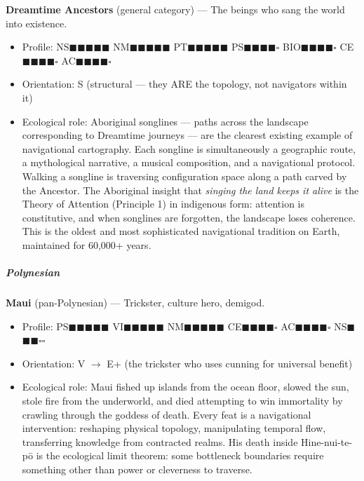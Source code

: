 \textbf{Dreamtime Ancestors} (general category) — The beings who sang the world into existence.

\begin{itemize}[nosep,leftmargin=*]
  \item Profile: NS$\blacksquare$$\blacksquare$$\blacksquare$$\blacksquare$$\blacksquare$ NM$\blacksquare$$\blacksquare$$\blacksquare$$\blacksquare$$\blacksquare$ PT$\blacksquare$$\blacksquare$$\blacksquare$$\blacksquare$$\blacksquare$ PS$\blacksquare$$\blacksquare$$\blacksquare$$\blacksquare$$\square$ BIO$\blacksquare$$\blacksquare$$\blacksquare$$\blacksquare$$\square$ CE$\blacksquare$$\blacksquare$$\blacksquare$$\blacksquare$$\square$ AC$\blacksquare$$\blacksquare$$\blacksquare$$\blacksquare$$\square$
  \item Orientation: S (structural — they ARE the topology, not navigators within it)
  \item Ecological role: Aboriginal songlines — paths across the landscape corresponding to Dreamtime journeys — are the clearest existing example of navigational cartography. Each songline is simultaneously a geographic route, a mythological narrative, a musical composition, and a navigational protocol. Walking a songline is traversing configuration space along a path carved by the Ancestor. The Aboriginal insight that \textit{singing the land keeps it alive} is the Theory of Attention (Principle 1) in indigenous form: attention is constitutive, and when songlines are forgotten, the landscape loses coherence. This is the oldest and most sophisticated navigational tradition on Earth, maintained for 60,000+ years.
\end{itemize}


\subparagraph*{Polynesian}


\textbf{Maui} (pan-Polynesian) — Trickster, culture hero, demigod.

\begin{itemize}[nosep,leftmargin=*]
  \item Profile: PS$\blacksquare$$\blacksquare$$\blacksquare$$\blacksquare$$\blacksquare$ VI$\blacksquare$$\blacksquare$$\blacksquare$$\blacksquare$$\blacksquare$ NM$\blacksquare$$\blacksquare$$\blacksquare$$\blacksquare$$\blacksquare$ CE$\blacksquare$$\blacksquare$$\blacksquare$$\blacksquare$$\square$ AC$\blacksquare$$\blacksquare$$\blacksquare$$\blacksquare$$\square$ NS$\blacksquare$$\blacksquare$$\blacksquare$$\square$$\square$
  \item Orientation: V $\rightarrow$ E+ (the trickster who uses cunning for universal benefit)
  \item Ecological role: Maui fished up islands from the ocean floor, slowed the sun, stole fire from the underworld, and died attempting to win immortality by crawling through the goddess of death. Every feat is a navigational intervention: reshaping physical topology, manipulating temporal flow, transferring knowledge from contracted realms. His death inside Hine-nui-te-pō is the ecological limit theorem: some bottleneck boundaries require something other than power or cleverness to traverse.
\end{itemize}



